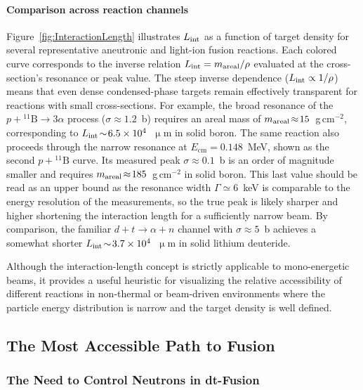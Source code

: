 \documentclass[particles,article,accept,pdftex,moreauthors]{Definitions/mdpi}
\begin{document}
\paragraph*{\bf Comparison across reaction channels}
Figure~\ref{fig:InteractionLength} illustrates $L_{\rm int}$ as a function of target density for several representative aneutronic and light-ion fusion reactions. Each colored curve corresponds to the inverse relation $L_{\rm int} = m_{\rm areal}/\rho$ evaluated at the cross-section's resonance or peak value. The steep inverse dependence ($L_{\rm int}\propto 1/\rho$) means that even dense condensed-phase targets remain effectively transparent for reactions with small cross-sections. For example, the broad resonance of the $p+{}^{11}\mathrm{B}\!\to\!3\alpha$ process ($\sigma\!\approx\!1.2$~b) requires an areal mass of $m_{\rm areal}\!\approx\!15$~g\,cm${}^{-2}$, corresponding to $L_{\rm int}\!\sim\!6.5\times10^{4}$~$\upmu$m in solid boron. The same reaction also proceeds through the narrow resonance at $E_\mathrm{cm}=0.148$~MeV, shown as the second $p+{}^{11}\mathrm{B}$ curve. Its measured peak $\sigma\!\approx\!0.1$~b is an order of magnitude smaller and requires $m_{\rm areal}\!\approx\!185$~g\,cm${}^{-2}$ in solid boron. This last value should be read as an upper bound as the resonance width $\Gamma\!\simeq\!6$~keV is comparable to the energy resolution of the measurements, so the true peak is likely sharper and higher shortening the interaction length for a sufficiently narrow beam. By comparison, the familiar $d+t\!\to\!\alpha+n$ channel with $\sigma\!\approx\!5$~b achieves a somewhat shorter $L_{\rm int}\!\sim\!3.7\times10^{4}$~$\upmu$m in solid lithium deuteride.

Although the interaction-length concept is strictly applicable to mono-energetic beams, it provides a useful heuristic for visualizing the relative accessibility of different reactions in non-thermal or beam-driven environments where the particle energy distribution is narrow and the target density is well defined.

\subsection{The Most Accessible Path to Fusion}\label{ssec:eazyfusion}
\subsubsection{The Need to Control Neutrons in dt-Fusion}\label{sssec:ICFneutrons}
\end{document}

